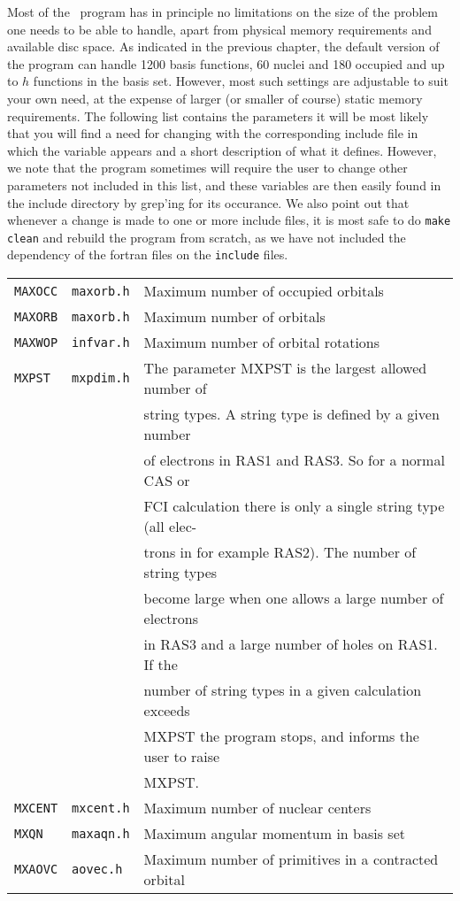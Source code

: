 Most of the \siraba\ program has in principle no limitations on
the size of the problem one needs to be able to handle, apart from
physical memory requirements and available disc space. As
indicated in the previous chapter, the default version of the
program can handle 1200 basis functions, 60 nuclei and 180
occupied and up to $h$ functions in the basis set. However, most
such settings are adjustable to suit your own need, at the expense
of larger (or smaller of course) static memory requirements. The
following list contains the parameters it will be most likely that
you will find a need for changing with the corresponding include
file in which the variable appears and a short description of what
it defines. However, we note that the program sometimes will
require the user to change other parameters not included in this
list, and these variables are then easily found in the include
directory by grep'ing for its occurance. We also point out that
whenever a change is made to one or more include files, it is most
safe to do \verb|make clean| and rebuild the program from scratch,
as we have not included the dependency of the fortran files on the
\verb|include| files.

\bigskip

\begin{tabular}{lll}
\verb|MAXOCC| & \verb|maxorb.h| & Maximum number of occupied
orbitals\index{occupied orbitals}\index{limits}\\
\verb|MAXORB| & \verb|maxorb.h| & Maximum number of orbitals\index{orbitals}\index{limits}\\
\verb|MAXWOP| & \verb|infvar.h| & Maximum number of orbital
rotations\index{orbital rotations}\index{limits}\\
\verb|MXPST| & \verb|mxpdim.h| & The parameter MXPST is the largest
allowed number\index{string numbers}\index{limits} of \\ && string types.
A string type is defined by a given number \\&& of electrons in RAS1 and
RAS3. So for a normal CAS or \\ &&  FCI calculation there is only a
single string
type (all elec-\\&&trons in for example RAS2). The number of string types
 \\ & & become large when one allows a large number of electrons
 \\ &&  in  RAS3  and a large number of holes on RAS1. If the
\\ && number of  string types
in a given calculation exceeds  \\&&  MXPST the program stops, and
informs the user to raise\\&& MXPST.\\
\verb|MXCENT| & \verb|mxcent.h| & Maximum number of nuclear
centers\index{atomic centers}\index{limits}\\
\verb|MXQN| & \verb|maxaqn.h| & Maximum angular momentum in basis
set\index{angular momentum}\index{limits}\\
\verb|MXAOVC| & \verb|aovec.h| & Maximum number of primitives in a
contracted orbital\index{primitive orbitals}\index{limits}
\end{tabular}

